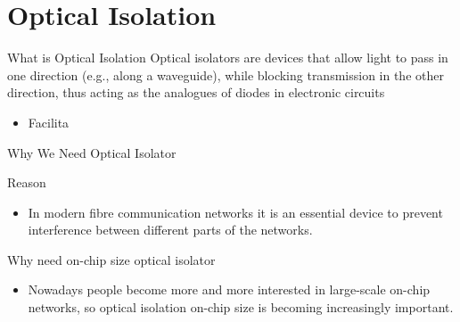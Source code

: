 \documentclass{beamer}
\begin{document}
\section{Optical Isolation}
\begin{frame}{What is Optical Isolation}
Optical isolators are devices that allow light to pass in one direction (e.g., along a waveguide), while blocking transmission in the other direction, thus acting as the analogues of diodes in electronic circuits
\begin{itemize}
    \item Facilita
\end{itemize}
\vskip 3cm
\end{frame}

\begin{frame}{Why We Need Optical Isolator}
    \begin{block}
    {Reason}
      \begin{itemize}
        \item In modern fibre communication networks it is an essential device to prevent interference between different parts of the networks.
    \end{itemize}
  \end{block}
  \vskip 1cm
  \begin{block}{Why need on-chip size optical isolator}
    \begin{itemize}
        \item Nowadays people become more and more interested in large-scale on-chip networks, so optical isolation on-chip size is becoming increasingly important. 
    \end{itemize}
  \end{block}
\end{frame}
\end{document}
